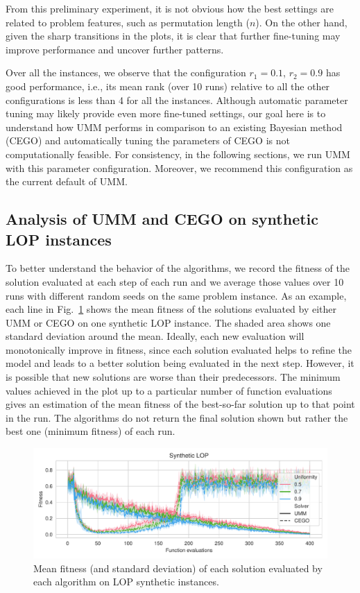 \documentclass[runningheads]{llncs}
\begin{document}
From this preliminary experiment, it is not obvious how the best settings are
related to problem features, such as permutation length ($n$). On the other
hand, given the sharp transitions in the plots, it is clear that further
fine-tuning may improve performance and uncover further patterns.

Over all the instances, we observe that the configuration $r_1 =0.1$, $r_2=0.9$
has good performance, i.e., its mean rank (over 10 runs) relative to all the
other configurations is less than 4 for all the instances.  Although automatic
parameter tuning may likely provide even more fine-tuned settings, our goal
here is to understand how UMM performs in comparison to an existing Bayesian
method (CEGO) and automatically tuning the parameters of CEGO is not
computationally feasible.  For consistency, in the following sections, we run
UMM with this parameter configuration.  Moreover, we recommend this
configuration as the current default of UMM.

\subsection{Analysis of UMM and CEGO on synthetic LOP instances}

To better understand the behavior of the algorithms, we record the fitness of
the solution evaluated at each step of each run and we average those values
over 10 runs with different random seeds on the same problem instance.  As an
example, each line in Fig.~\ref{fig:lop_synth} shows the mean fitness of the
solutions evaluated by either UMM or CEGO on one synthetic LOP instance. The
shaded area shows one standard deviation around the mean. Ideally, each new
evaluation will monotonically improve in fitness, since each solution evaluated
helps to refine the model and leads to a better solution being evaluated in the
next step.  However, it is possible that new solutions are worse
than their predecessors. %
The minimum values
achieved in the plot up to a particular number of function evaluations gives an
estimation of the mean fitness of the best-so-far solution up to that point in
the run. The algorithms do not return the final solution shown but rather the
best one (minimum fitness) of each run.


\begin{figure}[tb]
  \centering%
  \includegraphics[width=\textwidth]{../img/synthetic_LOP_combined}
  \caption{Mean fitness  (and standard deviation)  of each solution evaluated by each algorithm on LOP synthetic instances.\label{fig:lop_synth}}
\end{figure}
\end{document}
